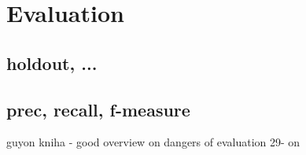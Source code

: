 \chapter{Evaluation}

\section{holdout, ...}

\section{prec, recall, f-measure}

guyon kniha - good overview on dangers of evaluation 29- on
